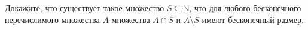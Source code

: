 Докажите, что существует такое множество $S \subseteq \mathbb{N}$, что для любого бесконечного перечислимого множества $A$
множества $A \cap S$ и $A \setminus S$ имеют бесконечный размер.